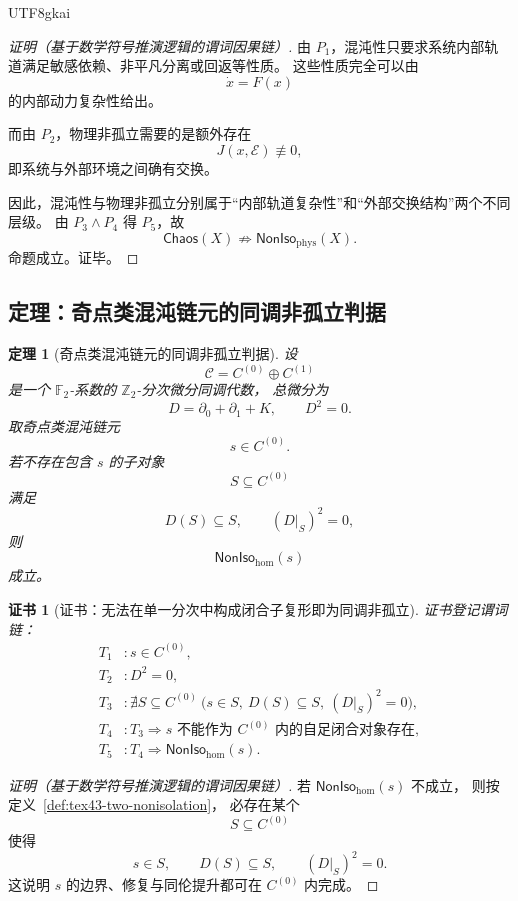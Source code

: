 \documentclass[12pt]{article}
\newtheorem{theorem}{定理}[section]
\newtheorem{Certificate}{证书}[section]
\newcommand{\Ztwo}{\mathbb{Z}_2}
\newcommand{\Ftwo}{\mathbb{F}_2}
\begin{document}
\begin{CJK*}{UTF8}{gkai}
\begin{proof}[证明（基于数学符号推演逻辑的谓词因果链）]
由 $P_1$，混沌性只要求系统内部轨道满足敏感依赖、非平凡分离或回返等性质。
这些性质完全可以由
\[
  \dot x=F(x)
\]
的内部动力复杂性给出。

而由 $P_2$，物理非孤立需要的是额外存在
\[
  J(x,\mathcal E)\not\equiv 0,
\]
即系统与外部环境之间确有交换。

因此，混沌性与物理非孤立分别属于“内部轨道复杂性”和“外部交换结构”两个不同层级。
由 $P_3\wedge P_4$ 得 $P_5$，故
\[
  \mathsf{Chaos}(X)\not\Rightarrow \mathsf{NonIso}_{\mathrm{phys}}(X).
\]
命题成立。证毕。
\end{proof}

\subsection{定理：奇点类混沌链元的同调非孤立判据}
\label{subsec:tex43-ch6-theorem-criterion}

\begin{theorem}[奇点类混沌链元的同调非孤立判据]
\label{thm:tex43-singular-hom-noniso}
设
\[
  \mathcal C=C^{(0)}\oplus C^{(1)}
\]
是一个 $\Ftwo$-系数的 $\Ztwo$-分次微分同调代数，
总微分为
\[
  D=\partial_0+\partial_1+K,
  \qquad
  D^2=0.
\]
取奇点类混沌链元
\[
  s\in C^{(0)}.
\]
若不存在包含 $s$ 的子对象
\[
  S\subseteq C^{(0)}
\]
满足
\[
  D(S)\subseteq S,
  \qquad
  (D|_S)^2=0,
\]
则
\[
  \mathsf{NonIso}_{\mathrm{hom}}(s)
\]
成立。
\end{theorem}

\begin{Certificate}[证书：无法在单一分次中构成闭合子复形即为同调非孤立]
\label{cert:tex43-singular-hom-noniso}
证书登记谓词链：
\[
\begin{aligned}
  T_1 &: s\in C^{(0)},\\
  T_2 &: D^2=0,\\
  T_3 &: \nexists S\subseteq C^{(0)}\
         \big(s\in S,\ D(S)\subseteq S,\ (D|_S)^2=0\big),\\
  T_4 &: T_3 \Rightarrow s\text{ 不能作为 }C^{(0)}\text{ 内的自足闭合对象存在},\\
  T_5 &: T_4 \Rightarrow \mathsf{NonIso}_{\mathrm{hom}}(s).
\end{aligned}
\]
\end{Certificate}

\begin{proof}[证明（基于数学符号推演逻辑的谓词因果链）]
若 $\mathsf{NonIso}_{\mathrm{hom}}(s)$ 不成立，
则按定义~\ref{def:tex43-two-nonisolation}，
必存在某个
\[
  S\subseteq C^{(0)}
\]
使得
\[
  s\in S,
  \qquad
  D(S)\subseteq S,
  \qquad
  (D|_S)^2=0.
\]
这说明 $s$ 的边界、修复与同伦提升都可在 $C^{(0)}$ 内完成。


\end{proof}
\end{CJK*}
\end{document}
